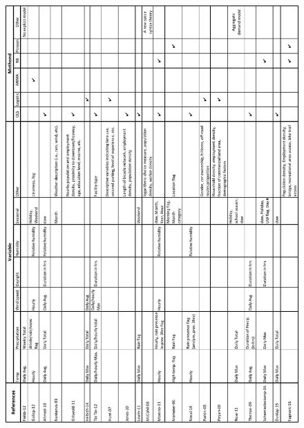 \documentclass [11pt, proquest] {uwthesis}[2015/03/03]
\begin{document}
\begin{figure}
\vspace{-15pt}
  \includegraphics[width=1\textwidth]{figures/literature}
   \label{tb:lit}
\end{figure}
\end{document}
